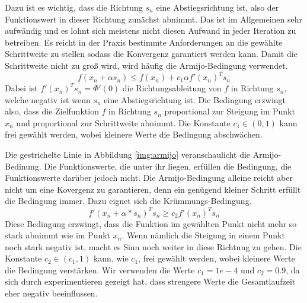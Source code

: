 \documentclass[runningheads,a4paper]{llncs}
\begin{document}
Dazu ist es wichtig, dass die Richtung $s_n$ eine Abstiegsrichtung ist, also der Funktionswert in dieser Richtung zunächst abnimmt. Das ist im Allgemeinen sehr aufwändig und es lohnt sich meistens nicht diesen Aufwand in jeder Iteration zu betreiben. Es reicht in der Praxis bestimmte Anforderungen an die gewählte Schrittweite zu stellen sodass die Konvergenz garantiert werden kann. Damit die Schrittweite nicht zu groß wird, wird häufig die Armijo-Bedingung verwendet.
\begin{equation}
\label{eq:armijo}
f(x_n+\alpha s_n) \le f(x_n)+c_1\alpha f'(x_n)^T s_n
\end{equation}
Dabei ist $f'(x_n)^T s_n = \Phi'(0)$ die Richtungsableitung von $f$ in Richtung $s_n$, welche negativ ist wenn $s_n$ eine Abstiegsrichtung ist. Die Bedingung erzwingt also, dass die Zielfunktion $f$ in Richtung $s_n$ proportional zur Steigung im Punkt $x_n$ und proportional zur Schrittweite abnimmt. Die Konstante $c_1 \in (0,1)$ kann frei gewählt werden, wobei kleinere Werte die Bedingung abschwächen.

Die gestrichelte Linie in Abbildung \ref{img:armijo} veranschaulicht die Armijo-Bedinung. Die Funktionswerte, die unter ihr liegen, erfüllen die Bedingung, die Funktionswerte darüber jedoch nicht. Die Armijo-Bedingung alleine reicht aber nicht um eine Kovergenz zu garantieren, denn ein genügend kleiner Schritt erfüllt die Bedingung immer. Dazu eignet sich die Krümmungs-Bedingung.
\begin{equation}
\label{eq:curvature}
f'(x_n+\alpha*s_n)^T s_n \ge c_2 f'(x_n)^T s_n
\end{equation}
Diese Bedingung erzwingt, dass die Funktion im gewählten Punkt nicht mehr so stark abnimmt wie im Punkt $x_n$. Wenn nämlich die Steigung in einem Punkt noch stark negativ ist, macht es Sinn noch weiter in diese Richtung zu gehen. Die Konstante ${c_2\in (c_1,1)}$ kann, wie $c_1$, frei gewählt werden, wobei kleinere Werte die Bedingung verstärken. Wir verwenden die Werte $c_1 = 1e-4$ und $c_2 = 0.9$, da sich durch experimentieren gezeigt hat, dass strengere Werte die Gesamtlaufzeit eher negativ beeinflussen.
\end{document}

